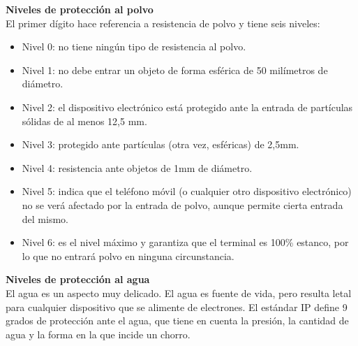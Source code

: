 \textbf{Niveles de protección al polvo} \\
El primer dígito hace referencia a resistencia de polvo y tiene seis niveles:

\begin{itemize}
	\item Nivel 0: no tiene ningún tipo de resistencia al polvo.
	\item Nivel 1: no debe entrar un objeto de forma esférica de 50 
		milímetros de diámetro.
	\item Nivel 2: el dispositivo electrónico está protegido ante la entrada 
		de partículas sólidas de al menos 12,5 mm.
	\item Nivel 3: protegido ante partículas (otra vez, esféricas) de 2,5mm.
	\item Nivel 4: resistencia ante objetos de 1mm de diámetro.
	\item Nivel 5: indica que el teléfono móvil (o cualquier otro 
		dispositivo electrónico) no se verá afectado por la entrada de 
		polvo, aunque permite cierta entrada del mismo.
	\item Nivel 6: es el nivel máximo y garantiza que el terminal es 100\% 
		estanco, por lo que no entrará polvo en ninguna circunstancia.
\end{itemize}

\textbf{Niveles de protección al agua} \\
El agua es un aspecto muy delicado. El agua es fuente de vida, pero resulta 
letal para cualquier dispositivo que se alimente de electrones. El estándar IP 
define 9 grados de protección ante el agua, que tiene en cuenta la presión, la 
cantidad de agua y la forma en la que incide un chorro.


